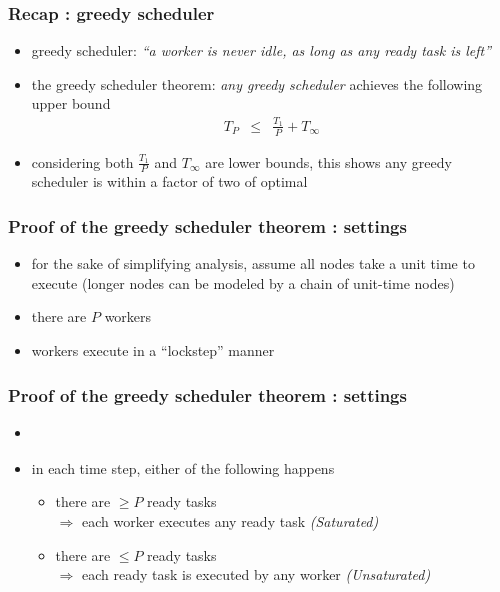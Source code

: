 \documentclass[12pt,dvipdfmx]{beamer}
\newcommand{\ao}[1]{{\color{blue}#1}}
\newcommand{\aka}[1]{{\color{red}#1}}
\begin{document}
\begin{frame}
\frametitle{Recap : greedy scheduler}
\begin{itemize}
\item greedy scheduler: 
\ao{\em ``a worker is never idle, as long as any ready task is left''}
\begin{center}
\def\svgwidth{0.4\textwidth}
{\scriptsize}
\end{center}

\item \ao{the greedy scheduler theorem:}
\aka{\em any greedy scheduler} achieves the following upper bound
\begin{eqnarray*}
T_P & \leq & \frac{T_1}{P} + T_\infty
\end{eqnarray*}
\item considering both $\frac{T_1}{P}$ and $T_\infty$ are 
  lower bounds, this shows any greedy scheduler is within a factor
  of two of optimal
\end{itemize}

\end{frame}

\begin{frame}
\frametitle{Proof of the greedy scheduler theorem : settings}
\begin{itemize}
\item for the sake of simplifying analysis, 
  assume all nodes take a unit time to execute
  (longer nodes can be modeled by a chain of unit-time nodes)
\item there are $P$ workers 
\item workers execute in a ``lockstep'' manner
\end{itemize}
\end{frame}

\begin{frame}
\frametitle{Proof of the greedy scheduler theorem : settings}
\begin{itemize}
\item []
\begin{center}
%
%
%
\end{center}

\item in each time step, either of the following happens
  \begin{itemize}
  \item<2-> [{\bf (S)}] there are $\geq P$ ready tasks \\ $\Rightarrow$ each worker executes any ready task {\em (Saturated)}
  \item<3-> [{\bf (U)}] there are $\leq P$ ready tasks \\ $\Rightarrow$ each ready task is executed by any worker {\em (Unsaturated)}
  \end{itemize}

\end{itemize}
\end{frame}
\end{document}
